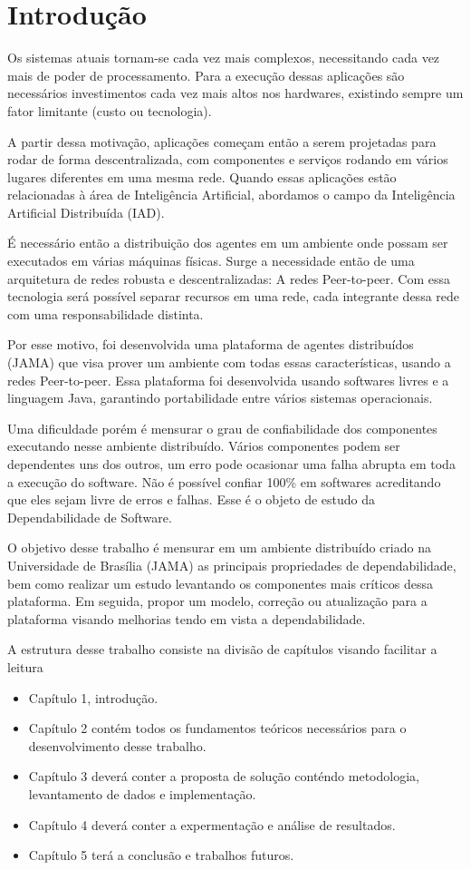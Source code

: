 \chapter{Introdução}

Os sistemas atuais tornam-se cada vez mais complexos, necessitando cada vez mais de poder de processamento. Para a execução dessas aplicações são necessários investimentos cada vez mais altos nos hardwares, existindo sempre um fator limitante (custo ou tecnologia).

A partir dessa motivação, aplicações começam então a serem projetadas para rodar de forma descentralizada, com componentes e serviços rodando em vários lugares diferentes em uma mesma rede. Quando essas aplicações estão relacionadas à área de Inteligência Artificial, abordamos o campo da Inteligência Artificial Distribuída (IAD).

É necessário então a distribuição dos agentes em um ambiente onde possam ser executados em várias máquinas físicas. Surge a necessidade então de uma arquitetura de redes robusta e descentralizadas: A redes Peer-to-peer. Com essa tecnologia será possível separar recursos em uma rede, cada integrante dessa rede com uma responsabilidade distinta.

Por esse motivo, foi desenvolvida uma plataforma de agentes distribuídos (JAMA) que visa prover um ambiente com todas essas características, usando a redes Peer-to-peer. Essa plataforma foi desenvolvida usando softwares livres e a linguagem Java, garantindo portabilidade entre vários sistemas operacionais.

Uma dificuldade porém é mensurar o grau de confiabilidade dos componentes executando nesse ambiente distribuído. Vários componentes podem ser dependentes uns dos outros, um erro pode ocasionar uma falha abrupta em toda a execução do software. Não é possível confiar 100\% em softwares acreditando que eles sejam livre de erros e falhas. Esse é o objeto de estudo da Dependabilidade de Software.

O objetivo desse trabalho é mensurar em um ambiente distribuído criado na Universidade de Brasília (JAMA) as principais propriedades de dependabilidade, bem como realizar um estudo levantando os componentes mais críticos dessa plataforma. Em seguida, propor um modelo, correção ou atualização para a plataforma visando melhorias tendo em vista a dependabilidade.

A estrutura desse trabalho consiste na divisão de capítulos visando facilitar a leitura
\begin{itemize}
	\item Capítulo 1, introdução.
	\item Capítulo 2 contém todos os fundamentos teóricos necessários para o desenvolvimento desse trabalho.
	\item Capítulo 3 deverá conter a proposta de solução conténdo metodologia, levantamento de dados e implementação.
	\item Capítulo 4 deverá conter a expermentação e análise de resultados.
	\item Capítulo 5 terá a conclusão e trabalhos futuros.
\end{itemize}
